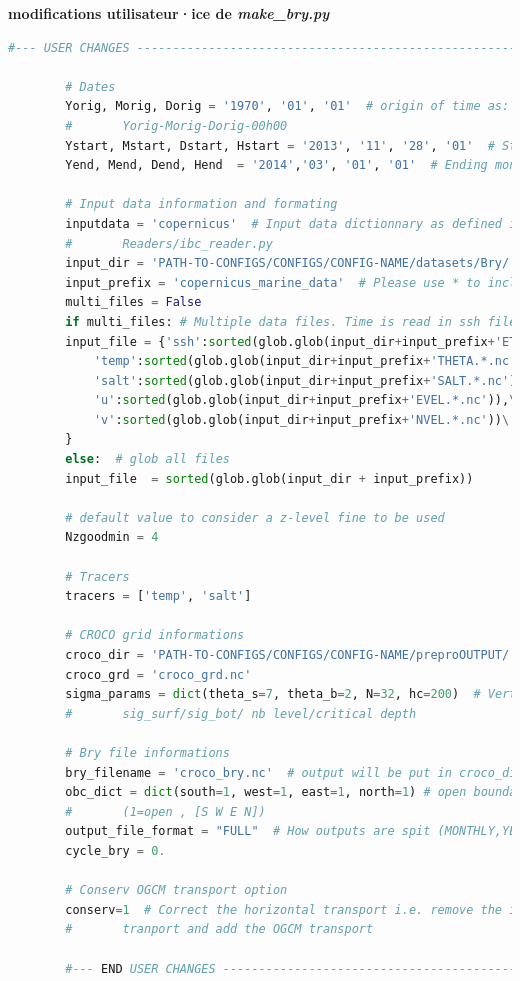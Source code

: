 \documentclass[10pt,a4paper,titlepage]{article}
\begin{document}
\begin{codeEnv}{\textbf{modifications utilisateur·ice de \textit{make\_bry.py}}}
    \begin{lstlisting}[language=python]
        #--- USER CHANGES ---------------------------------------------------------

        # Dates
        Yorig, Morig, Dorig = '1970', '01', '01'  # origin of time as: days since
        #       Yorig-Morig-Dorig-00h00
        Ystart, Mstart, Dstart, Hstart = '2013', '11', '28', '01'  # Starting month
        Yend, Mend, Dend, Hend  = '2014','03', '01', '01'  # Ending month

        # Input data information and formating
        inputdata = 'copernicus'  # Input data dictionnary as defined in the
        #       Readers/ibc_reader.py
        input_dir = 'PATH-TO-CONFIGS/CONFIGS/CONFIG-NAME/datasets/Bry/'
        input_prefix = 'copernicus_marine_data'  # Please use * to include all files
        multi_files = False
        if multi_files: # Multiple data files. Time is read in ssh file
        input_file = {'ssh':sorted(glob.glob(input_dir+input_prefix+'ETAN.*.nc')),\
            'temp':sorted(glob.glob(input_dir+input_prefix+'THETA.*.nc')),\
            'salt':sorted(glob.glob(input_dir+input_prefix+'SALT.*.nc')),\
            'u':sorted(glob.glob(input_dir+input_prefix+'EVEL.*.nc')),\
            'v':sorted(glob.glob(input_dir+input_prefix+'NVEL.*.nc'))\
        }
        else:  # glob all files
        input_file  = sorted(glob.glob(input_dir + input_prefix))

        # default value to consider a z-level fine to be used
        Nzgoodmin = 4

        # Tracers
        tracers = ['temp', 'salt']

        # CROCO grid informations
        croco_dir = 'PATH-TO-CONFIGS/CONFIGS/CONFIG-NAME/preproOUTPUT/'
        croco_grd = 'croco_grd.nc'
        sigma_params = dict(theta_s=7, theta_b=2, N=32, hc=200)  # Vertical streching,
        #       sig_surf/sig_bot/ nb level/critical depth

        # Bry file informations
        bry_filename = 'croco_bry.nc'  # output will be put in croco_dir by default
        obc_dict = dict(south=1, west=1, east=1, north=1) # open boundaries
        #       (1=open , [S W E N])
        output_file_format = "FULL"  # How outputs are spit (MONTHLY,YEARLY,FULL)
        cycle_bry = 0.

        # Conserv OGCM transport option
        conserv=1  # Correct the horizontal transport i.e. remove the integrated
        #       tranport and add the OGCM transport

        #--- END USER CHANGES -----------------------------------------------------
    \end{lstlisting}
\end{codeEnv}
\end{document}

